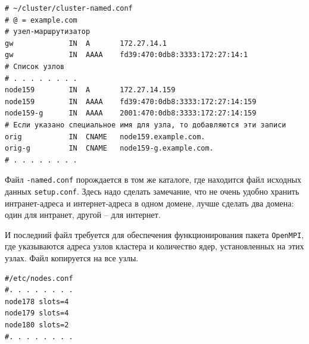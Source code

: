 \documentclass[12pt]{article}
\begin{document}
\begin{verbatim}
# ~/cluster/cluster-named.conf
# @ = example.com
# узел-маршрутизатор
gw             IN  A       172.27.14.1
gw             IN  AAAA    fd39:470:0db8:3333:172:27:14:1
# Список узлов
# . . . . . . . .
node159        IN  A       172.27.14.159
node159        IN  AAAA    fd39:470:0db8:3333:172:27:14:159
node159-g      IN  AAAA    2001:470:0db8:3333:172:27:14:159
# Если указано специальное имя для узла, то добавляются эти записи
orig           IN  CNAME   node159.example.com.
orig-g         IN  CNAME   node159-g.example.com.
# . . . . . . . .
\end{verbatim}
Файл \texttt{-named.conf} порождается в том же каталоге, где находится файл исходных данных \texttt{setup.conf}. Здесь надо сделать замечание, что не очень удобно хранить интранет-адреса и интернет-адреса в одном домене, лучше сделать два домена: один для интранет, другой -- для интернет.

И последний файл требуется для обеспечения функционирования пакета \texttt{OpenMPI}, где указываются адреса узлов кластера и количество ядер, установленных на этих узлах. Файл копируется на все узлы.
\begin{verbatim}
#/etc/nodes.conf
#. . . . . . . .
node178 slots=4
node179 slots=4
node180 slots=2
#. . . . . . . .
\end{verbatim}
\end{document}
